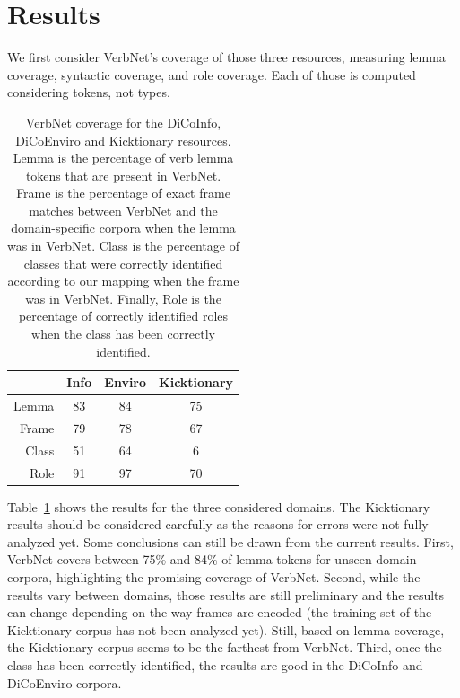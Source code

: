 \section{Results}
\label{sec:domainsrlresults}

We first consider VerbNet's coverage of those three resources, measuring lemma
coverage, syntactic coverage, and role coverage. Each of those is computed
considering tokens, not types.

\begin{table}[h]
\centering
\begin{tabular}{rccc}
  \toprule
        & Info & Enviro & Kicktionary \\
  \midrule
  Lemma & 83 & 84 & 75 \\
  Frame & 79 & 78 & 67 \\
  Class & 51 & 64 & 6  \\
  Role  & 91 & 97 & 70 \\
  \bottomrule
\end{tabular}

\caption{\protect\label{table:coverage} VerbNet coverage for the DiCoInfo,
DiCoEnviro and Kicktionary resources. Lemma is the percentage of verb lemma
tokens that are present in VerbNet. Frame is the percentage of exact frame
matches between VerbNet and the domain-specific corpora when the lemma was in
VerbNet. Class is the percentage of classes that were correctly identified
according to our mapping when the frame was in VerbNet. Finally, Role is the
percentage of correctly identified roles when the class has been correctly
identified.}

\end{table}

Table~\ref{table:coverage} shows the results for the three considered domains.
The Kicktionary results should be considered carefully as the reasons for
errors were not fully analyzed yet. Some conclusions can still be drawn from
the current results. First, VerbNet covers between 75\% and 84\% of lemma
tokens for unseen domain corpora, highlighting the promising coverage of
VerbNet.  Second, while the results vary between domains, those results are
still preliminary and the results can change depending on the way frames are
encoded (the training set of the Kicktionary corpus has not been analyzed yet).
Still, based on lemma coverage, the Kicktionary corpus seems to be the farthest
from VerbNet. Third, once the class has been correctly identified, the results
are good in the DiCoInfo and DiCoEnviro corpora.

